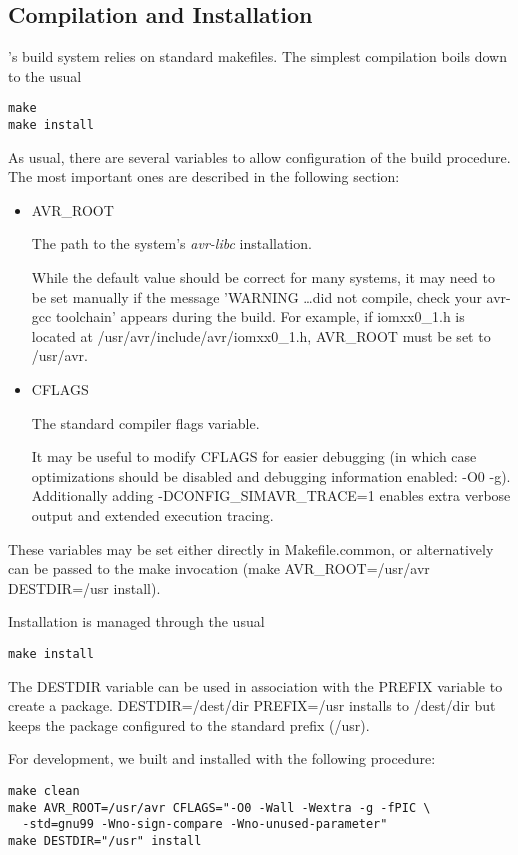 \subsection{Compilation and Installation}

\simavr's build system relies on standard makefiles. The simplest compilation
boils down to the usual

\begin{verbatim}
make
make install
\end{verbatim}

As usual, there are several variables to allow configuration of the build
procedure. The most important ones are described in the following section:

\begin{itemize}
\item AVR\_ROOT

The path to the system's \emph{avr-libc} installation.

While the default value
should be correct for many systems, it may need to be set manually if the
message 'WARNING \ldots did not compile, check your avr-gcc
toolchain' appears during the build. For example, if iomxx0\_1.h is located at
/usr/avr/include/avr/iomxx0\_1.h, AVR\_ROOT must be set to /usr/avr.

\item CFLAGS

The standard compiler flags variable.

It may be useful to modify CFLAGS for easier debugging (in which case
optimizations should be disabled and debugging information enabled: -O0 -g).
Additionally adding -DCONFIG\_SIMAVR\_TRACE=1 enables extra verbose output and
extended execution tracing.
\end{itemize}

These variables may be set either directly in Makefile.common, or alternatively
can be passed to the make invocation (make AVR\_ROOT=/usr/avr DESTDIR=/usr
install).

Installation is managed through the usual
\begin{verbatim}
make install
\end{verbatim}

The DESTDIR variable can be used in association with the PREFIX variable to create a \simavr package. DESTDIR=/dest/dir
PREFIX=/usr installs to /dest/dir but keeps the package configured to the standard prefix
(/usr).

For development, we built and installed \simavr with the following procedure:

\begin{verbatim}
make clean
make AVR_ROOT=/usr/avr CFLAGS="-O0 -Wall -Wextra -g -fPIC \
  -std=gnu99 -Wno-sign-compare -Wno-unused-parameter"
make DESTDIR="/usr" install
\end{verbatim}
